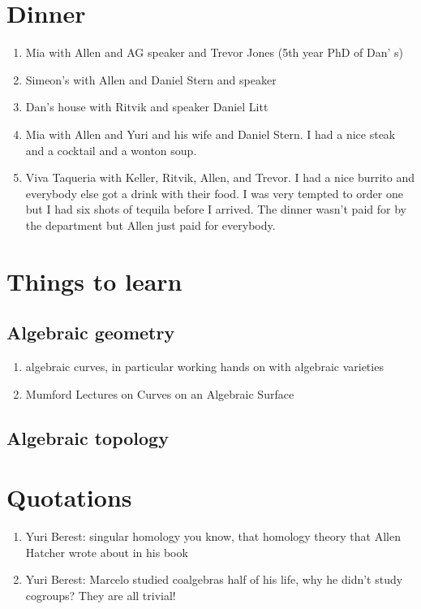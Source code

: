 \documentclass[12pt]{article}
\begin{document}
\section{Dinner}
\begin{enumerate}
    \item Mia with Allen and AG speaker and Trevor Jones (5th year PhD of Dan'
    s)
    \item Simeon's with Allen and Daniel Stern and speaker
    \item Dan's house with Ritvik and speaker Daniel Litt
    \item Mia with Allen and Yuri and his wife and Daniel Stern. I had a nice steak and a cocktail
    and a wonton soup.
    \item Viva Taqueria with Keller, Ritvik, Allen, and Trevor. I had a nice burrito 
    and everybody else got a drink with their food. I was very tempted to order one but I had six shots of 
    tequila before I arrived. The dinner wasn't paid for by the department but Allen just
    paid for everybody.
\end{enumerate}

\section{Things to learn}
\subsection{Algebraic geometry}
\begin{enumerate}
    \item algebraic curves, in particular working hands on with algebraic varieties
    \item Mumford Lectures on Curves on an Algebraic Surface
\end{enumerate}
\subsection{Algebraic topology}

\section{Quotations}
\begin{enumerate}
    \item Yuri Berest: singular homology you know, that homology theory that Allen Hatcher wrote about in his book
    \item Yuri Berest: Marcelo studied coalgebras half of his life, why he didn't study cogroups? They are all trivial!
\end{enumerate}
\end{document}

